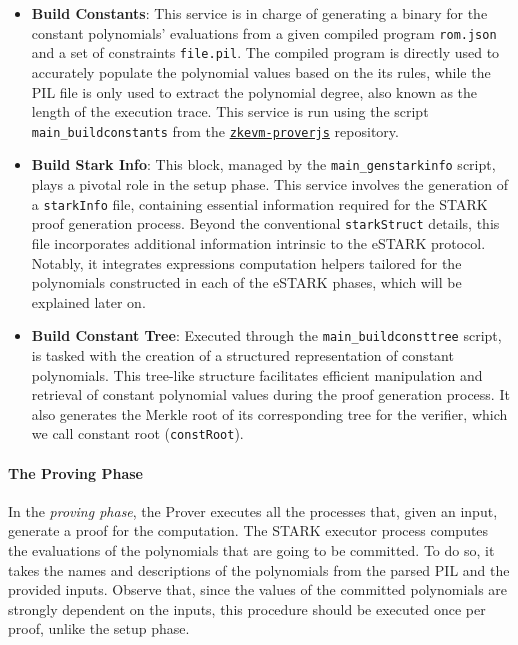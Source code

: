 \begin{itemize}

\item \textbf{Build Constants}: This service is in charge of generating a binary for the constant polynomials' evaluations from a given compiled program \texttt{rom.json} and a set of constraints \texttt{file.pil}. The compiled program is directly used to accurately populate the polynomial values based on the its rules, while the PIL file is only used to extract the polynomial degree, also known as the length of the execution trace. This service is run using the script \texttt{main\_buildconstants} from the \href{https://github.com/0xPolygonHermez/zkevm-proverjs}{\texttt{zkevm-proverjs}} repository.

\item \textbf{Build Stark Info}: This block, managed by the \texttt{main\_genstarkinfo} script, plays a pivotal role in the setup phase. This service involves the generation of a \texttt{starkInfo} file, containing essential information required for the STARK proof generation process. Beyond the conventional \texttt{starkStruct} details, this file incorporates additional information intrinsic to the eSTARK protocol. Notably, it integrates expressions computation helpers tailored for the polynomials constructed in each of the eSTARK phases, which will be explained later on.

\item \textbf{Build Constant Tree}: Executed through the \texttt{main\_buildconsttree} script, is tasked with the creation of a structured representation of constant polynomials. This tree-like structure facilitates efficient manipulation and retrieval of constant polynomial values during the proof generation process. It also generates the Merkle root of its corresponding tree for the verifier, which we call constant root (\texttt{constRoot}).

\end{itemize}

\paragraph*{The Proving Phase}

In the \textit{proving phase}, the Prover executes all the processes that, given an input, generate a proof for the computation. The STARK executor process computes the evaluations of the polynomials that are going to be committed. To do so, it takes the names and descriptions of the polynomials from the parsed PIL and the provided inputs. Observe that, since the values of the committed polynomials are strongly dependent on the inputs, this procedure should be executed once per proof, unlike the setup phase.

